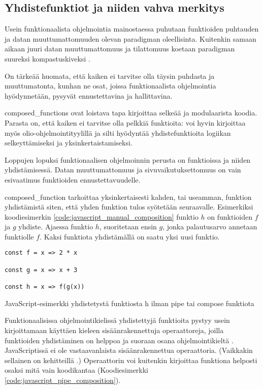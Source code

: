 \subsection{Yhdistefunktiot ja niiden vahva merkitys}

Usein funktionaalista ohjelmointia mainostaessa puhutaan funktioiden puhtauden ja datan muuttumattomuuden olevan paradigman oleellisinta. Kuitenkin samaan aikaan juuri datan muuttumattomuus ja tilattomuus koetaan paradigman suureksi kompastuskiveksi \cite{cantarella_fp_haitat,is_reduce_bad,vakil2016}.

On tärkeää huomata, että kaiken ei tarvitse olla täysin puhdasta ja muuttumatonta, kunhan ne osat, joissa funktionaalista ohjelmointia hyödynnetään, pysyvät ennustettavina ja hallittavina.

\Glspl{composed_function} ovat loistava tapa kirjoittaa selkeää ja modulaarista koodia. Parasta on, että kaiken ei tarvitse olla pelkkiä funktioita: voi hyvin kirjoittaa myös olio-ohjelmointityylillä ja silti hyödyntää yhdistefunktioita logiikan selkeyttämiseksi ja yksinkertaistamiseksi.

Loppujen lopuksi funktionaalisen ohjelmoinnin perusta on funktioissa ja niiden yhdistämisessä. Datan muuttumattomuus ja sivuvaikutuksettomuus on vain esivaatimus funktioiden ennustettavuudelle.

\Gls{composed_function} tarkoittaa yksinkertaisesti kahden, tai useamman, funktion yhdistämistä siten, että yhden funktion tulos syötetään seuraavalle. Esimerkiksi koodiesimerkin \ref{code:javascript_manual_composition} funktio $h$ on funktioiden $f$ ja $g$ yhdiste. Ajaessa funktio $h$, suoritetaan ensin $g$, jonka palautusarvo annetaan funktiolle $f$. Kaksi funktiota yhdistämällä on saatu yksi uusi funktio.

\begin{code}
    \begin{verbatim}
const f = x => 2 * x

const g = x => x + 3

const h = x => f(g(x))
\end{verbatim}
    \caption{JavaScript-esimerkki yhdistetystä funktiosta h ilman pipe tai compose funktiota}
    \label{code:javascript_manual_composition}
\end{code}

Funktionaalisissa ohjelmointikielissä yhdistettyjä funktioita pystyy usein kirjoittamaan käyttäen kieleen sisäänrakennettuja operaattoreja, joilla funktioiden yhdistäminen on helppoa ja suoraan osana ohjelmointikieltä \cite{fsharpcomposition,haskellcomposition}.
JavaScriptissä ei ole vastaavanlaista sisäänrakennettua operaattoria.
(Vaikkakin sellainen on kehitteillä \cite{tc39_pipeline_operator}.)
Operaattorin voi kuitenkin kirjoittaa funktiona helposti osaksi mitä vain koodikantaa (Koodiesimerkki \ref{code:javascript_pipe_composition}).

